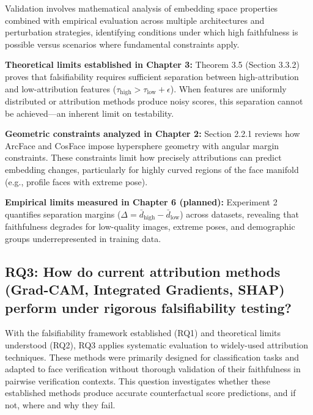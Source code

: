 Validation involves mathematical analysis of embedding space properties combined with empirical evaluation across multiple architectures and perturbation strategies, identifying conditions under which high faithfulness is possible versus scenarios where fundamental constraints apply.

\vspace{0.3cm}
\noindent\textbf{Theoretical limits established in Chapter 3:} Theorem 3.5 (Section 3.3.2) proves that falsifiability requires sufficient separation between high-attribution and low-attribu\-tion features ($\tau_{\text{high}} > \tau_{\text{low}} + \epsilon$). When features are uniformly distributed or attribution methods produce noisy scores, this separation cannot be achieved---an inherent limit on testability.

\vspace{0.3cm}
\noindent\textbf{Geometric constraints analyzed in Chapter 2:} Section 2.2.1 reviews how ArcFace and CosFace impose hypersphere geometry with angular margin constraints. These constraints limit how precisely attributions can predict embedding changes, particularly for highly curved regions of the face manifold (e.g., profile faces with extreme pose).

\vspace{0.3cm}
\noindent\textbf{Empirical limits measured in Chapter 6 (planned):} Experiment 2 quantifies separation margins ($\Delta = \bar{d}_{\text{high}} - \bar{d}_{\text{low}}$) across datasets, revealing that faithfulness degrades for low-quality images, extreme poses, and demographic groups underrepresented in training data.

\subsection*{RQ3: How do current attribution methods (Grad-CAM, Integrated Gradients, SHAP) perform under rigorous falsifiability testing?}

With the falsifiability framework established (RQ1) and theoretical limits understood (RQ2), RQ3 applies systematic evaluation to widely-used attribution techniques. These methods were primarily designed for classification tasks and adapted to face verification without thorough validation of their faithfulness in pairwise verification contexts. This question investigates whether these established methods produce accurate counterfactual score predictions, and if not, where and why they fail.

